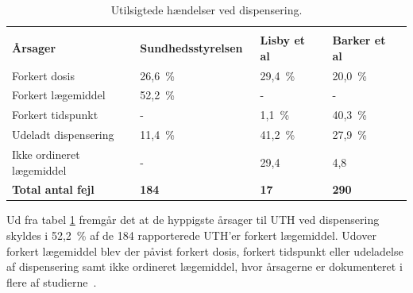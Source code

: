 \vspace{2mm}
\begin{longtable}{p{5cm}|p{3.5cm}|p{2cm}|p{2.3cm}}
	\caption{Utilsigtede hændelser ved dispensering.}
	\vspace{2mm}
	\label{table:UTHdispensering} \\
\cellcolor[HTML]{C0C0C0} {\textbf{Årsager}} & 
{\cellcolor[HTML]{C0C0C0}\textbf{Sundhedsstyrelsen~\citep{Sundhedsstyrelsen2005}}} &
{\cellcolor[HTML]{C0C0C0}\textbf{Lisby et al~\citep{Lisby2005}}} &
{\cellcolor[HTML]{C0C0C0}\textbf{Barker et al~\citep{Barker2002}}} \\ \hline
Forkert dosis & 26,6~\% & 29,4~\% &  20,0~\% \\ \hline
Forkert lægemiddel & 52,2~\% & - & - \\ \hline
Forkert tidspunkt & - & 1,1~\% & 40,3~\% \\ \hline
Udeladt dispensering & 11,4~\% & 41,2~\% & 27,9~\% \\ \hline
Ikke ordineret lægemiddel & - & 29,4 & 4,8 \\ \hline
\cellcolor[HTML]{C0C0C0} {\textbf{Total antal fejl}} & 
{\cellcolor[HTML]{C0C0C0}\textbf{184}} &
{\cellcolor[HTML]{C0C0C0}\textbf{17}} &
{\cellcolor[HTML]{C0C0C0}\textbf{290}}
\end{longtable}

Ud fra tabel \ref{table:UTHdispensering} fremgår det at de hyppigste årsager til UTH ved dispensering skyldes i 52,2~\% af de 184 rapporterede UTH'er forkert lægemiddel. Udover forkert lægemiddel blev der påvist forkert dosis, forkert tidspunkt eller udeladelse af dispensering samt ikke ordineret lægemiddel, hvor årsagerne er dokumenteret i flere af studierne~\citep{Lisby2005, Sundhedsstyrelsen2005,Barker2002}.

